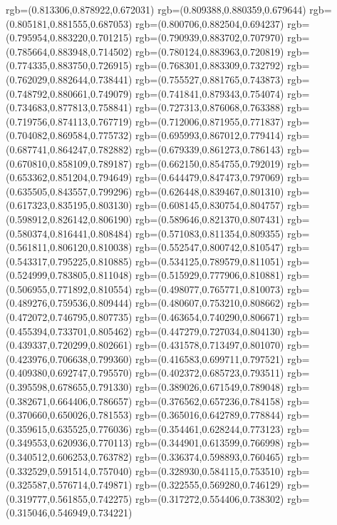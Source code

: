 {{{			rgb=(0.813306,0.878922,0.672031)
			rgb=(0.809388,0.880359,0.679644)
			rgb=(0.805181,0.881555,0.687053)
			rgb=(0.800706,0.882504,0.694237)
			rgb=(0.795954,0.883220,0.701215)
			rgb=(0.790939,0.883702,0.707970)
			rgb=(0.785664,0.883948,0.714502)
			rgb=(0.780124,0.883963,0.720819)
			rgb=(0.774335,0.883750,0.726915)
			rgb=(0.768301,0.883309,0.732792)
			rgb=(0.762029,0.882644,0.738441)
			rgb=(0.755527,0.881765,0.743873)
			rgb=(0.748792,0.880661,0.749079)
			rgb=(0.741841,0.879343,0.754074)
			rgb=(0.734683,0.877813,0.758841)
			rgb=(0.727313,0.876068,0.763388)
			rgb=(0.719756,0.874113,0.767719)
			rgb=(0.712006,0.871955,0.771837)
			rgb=(0.704082,0.869584,0.775732)
			rgb=(0.695993,0.867012,0.779414)
			rgb=(0.687741,0.864247,0.782882)
			rgb=(0.679339,0.861273,0.786143)
			rgb=(0.670810,0.858109,0.789187)
			rgb=(0.662150,0.854755,0.792019)
			rgb=(0.653362,0.851204,0.794649)
			rgb=(0.644479,0.847473,0.797069)
			rgb=(0.635505,0.843557,0.799296)
			rgb=(0.626448,0.839467,0.801310)
			rgb=(0.617323,0.835195,0.803130)
			rgb=(0.608145,0.830754,0.804757)
			rgb=(0.598912,0.826142,0.806190)
			rgb=(0.589646,0.821370,0.807431)
			rgb=(0.580374,0.816441,0.808484)
			rgb=(0.571083,0.811354,0.809355)
			rgb=(0.561811,0.806120,0.810038)
			rgb=(0.552547,0.800742,0.810547)
			rgb=(0.543317,0.795225,0.810885)
			rgb=(0.534125,0.789579,0.811051)
			rgb=(0.524999,0.783805,0.811048)
			rgb=(0.515929,0.777906,0.810881)
			rgb=(0.506955,0.771892,0.810554)
			rgb=(0.498077,0.765771,0.810073)
			rgb=(0.489276,0.759536,0.809444)
			rgb=(0.480607,0.753210,0.808662)
			rgb=(0.472072,0.746795,0.807735)
			rgb=(0.463654,0.740290,0.806671)
			rgb=(0.455394,0.733701,0.805462)
			rgb=(0.447279,0.727034,0.804130)
			rgb=(0.439337,0.720299,0.802661)
			rgb=(0.431578,0.713497,0.801070)
			rgb=(0.423976,0.706638,0.799360)
			rgb=(0.416583,0.699711,0.797521)
			rgb=(0.409380,0.692747,0.795570)
			rgb=(0.402372,0.685723,0.793511)
			rgb=(0.395598,0.678655,0.791330)
			rgb=(0.389026,0.671549,0.789048)
			rgb=(0.382671,0.664406,0.786657)
			rgb=(0.376562,0.657236,0.784158)
			rgb=(0.370660,0.650026,0.781553)
			rgb=(0.365016,0.642789,0.778844)
			rgb=(0.359615,0.635525,0.776036)
			rgb=(0.354461,0.628244,0.773123)
			rgb=(0.349553,0.620936,0.770113)
			rgb=(0.344901,0.613599,0.766998)
			rgb=(0.340512,0.606253,0.763782)
			rgb=(0.336374,0.598893,0.760465)
			rgb=(0.332529,0.591514,0.757040)
			rgb=(0.328930,0.584115,0.753510)
			rgb=(0.325587,0.576714,0.749871)
			rgb=(0.322555,0.569280,0.746129)
			rgb=(0.319777,0.561855,0.742275)
			rgb=(0.317272,0.554406,0.738302)
			rgb=(0.315046,0.546949,0.734221)
}}}
